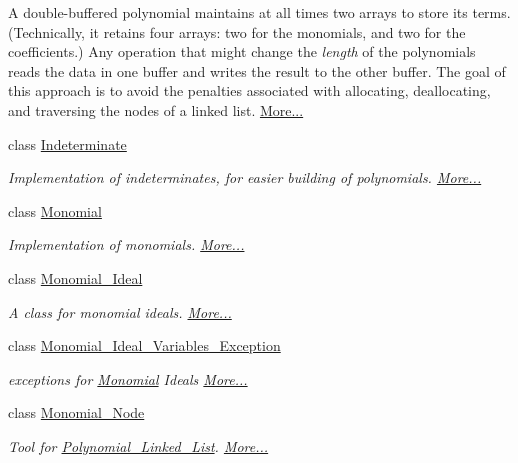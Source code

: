 \begin{DoxyCompactItemize}
\begin{DoxyCompactList}
A double-\/buffered polynomial maintains at all times two arrays to store its terms. (Technically, it retains four arrays\+: two for the monomials, and two for the coefficients.) Any operation that might change the {\itshape length} of the polynomials reads the data in one buffer and writes the result to the other buffer. The goal of this approach is to avoid the penalties associated with allocating, deallocating, and traversing the nodes of a linked list.  \hyperlink{group__polygroup_class_double___buffered___polynomial}{More...}\end{DoxyCompactList}\item 
class \hyperlink{group__polygroup_class_indeterminate}{Indeterminate}
\begin{DoxyCompactList}\small\item\em Implementation of indeterminates, for easier building of polynomials.  \hyperlink{group__polygroup_class_indeterminate}{More...}\end{DoxyCompactList}\item 
class \hyperlink{group__polygroup_class_monomial}{Monomial}
\begin{DoxyCompactList}\small\item\em Implementation of monomials.  \hyperlink{group__polygroup_class_monomial}{More...}\end{DoxyCompactList}\item 
class \hyperlink{group__polygroup_class_monomial___ideal}{Monomial\+\_\+\+Ideal}
\begin{DoxyCompactList}\small\item\em A class for monomial ideals.  \hyperlink{group__polygroup_class_monomial___ideal}{More...}\end{DoxyCompactList}\item 
class \hyperlink{group__polygroup_class_monomial___ideal___variables___exception}{Monomial\+\_\+\+Ideal\+\_\+\+Variables\+\_\+\+Exception}
\begin{DoxyCompactList}\small\item\em exceptions for \hyperlink{group__polygroup_class_monomial}{Monomial} Ideals  \hyperlink{group__polygroup_class_monomial___ideal___variables___exception}{More...}\end{DoxyCompactList}\item 
class \hyperlink{group__polygroup_class_monomial___node}{Monomial\+\_\+\+Node}
\begin{DoxyCompactList}\small\item\em Tool for \hyperlink{group__polygroup_class_polynomial___linked___list}{Polynomial\+\_\+\+Linked\+\_\+\+List}.  \hyperlink{group__polygroup_class_monomial___node}{More...}\end{DoxyCompactList}\item 

\end{DoxyCompactItemize}

